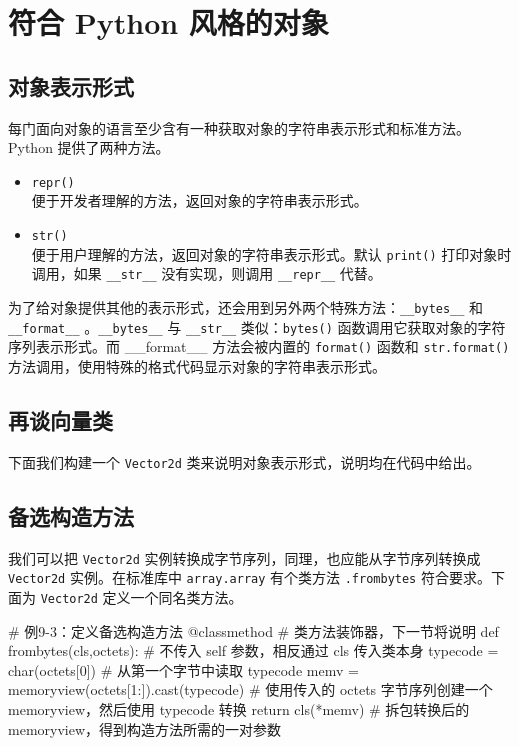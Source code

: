 \section{符合 Python 风格的对象}
\subsection{对象表示形式}

每门面向对象的语言至少含有一种获取对象的字符串表示形式和标准方法。Python 提供了两种方法。
\begin{itemize}
    \item \texttt{repr()} \\
    便于开发者理解的方法，返回对象的字符串表示形式。
    \item \texttt{str()} \\
    便于用户理解的方法，返回对象的字符串表示形式。默认 \texttt{print()} 打印对象时调用，如果 \texttt{\_\_str\_\_} 没有实现，则调用 \texttt{\_\_repr\_\_} 代替。
\end{itemize}

为了给对象提供其他的表示形式，还会用到另外两个特殊方法：\texttt{\_\_bytes\_\_} 和 \texttt{\_\_format\_\_} 。\texttt{\_\_bytes\_\_} 与 \texttt{\_\_str\_\_} 类似：\texttt{bytes()} 函数调用它获取对象的字符序列表示形式。而 {\_\_format\_\_} 方法会被内置的 \texttt{format()} 函数和 \texttt{str.format()} 方法调用，使用特殊的格式代码显示对象的字符串表示形式。

\subsection{再谈向量类}
下面我们构建一个 \texttt{Vector2d} 类来说明对象表示形式，说明均在代码中给出。



\subsection{备选构造方法}

我们可以把 \texttt{Vector2d} 实例转换成字节序列，同理，也应能从字节序列转换成 \texttt{Vector2d} 实例。在标准库中 \texttt{array.array} 有个类方法 \texttt{.frombytes} 符合要求。下面为 \texttt{Vector2d} 定义一个同名类方法。

\begin{python}
# 例9-3：定义备选构造方法
@classmethod    # 类方法装饰器，下一节将说明
def frombytes(cls,octets):  # 不传入 self 参数，相反通过 cls 传入类本身
    typecode = char(octets[0])  # 从第一个字节中读取 typecode
    memv = memoryview(octets[1:]).cast(typecode)    # 使用传入的 octets 字节序列创建一个 memoryview，然后使用 typecode 转换
    return cls(*memv)       # 拆包转换后的 memoryview，得到构造方法所需的一对参数
\end{python}

